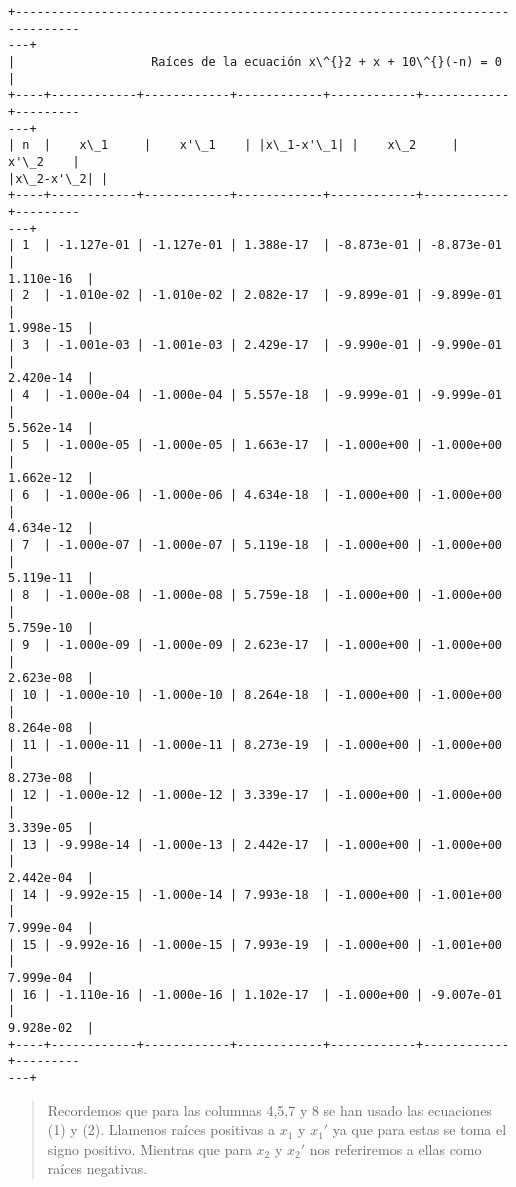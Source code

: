 \documentclass[9pt]{article}
\begin{document}
    \begin{Verbatim}[commandchars=\\\{\}]
+-------------------------------------------------------------------------------
---+
|                   Raíces de la ecuación x\^{}2 + x + 10\^{}(-n) = 0
|
+----+------------+------------+------------+------------+------------+---------
---+
| n  |    x\_1     |    x'\_1    | |x\_1-x'\_1| |    x\_2     |    x'\_2    |
|x\_2-x'\_2| |
+----+------------+------------+------------+------------+------------+---------
---+
| 1  | -1.127e-01 | -1.127e-01 | 1.388e-17  | -8.873e-01 | -8.873e-01 |
1.110e-16  |
| 2  | -1.010e-02 | -1.010e-02 | 2.082e-17  | -9.899e-01 | -9.899e-01 |
1.998e-15  |
| 3  | -1.001e-03 | -1.001e-03 | 2.429e-17  | -9.990e-01 | -9.990e-01 |
2.420e-14  |
| 4  | -1.000e-04 | -1.000e-04 | 5.557e-18  | -9.999e-01 | -9.999e-01 |
5.562e-14  |
| 5  | -1.000e-05 | -1.000e-05 | 1.663e-17  | -1.000e+00 | -1.000e+00 |
1.662e-12  |
| 6  | -1.000e-06 | -1.000e-06 | 4.634e-18  | -1.000e+00 | -1.000e+00 |
4.634e-12  |
| 7  | -1.000e-07 | -1.000e-07 | 5.119e-18  | -1.000e+00 | -1.000e+00 |
5.119e-11  |
| 8  | -1.000e-08 | -1.000e-08 | 5.759e-18  | -1.000e+00 | -1.000e+00 |
5.759e-10  |
| 9  | -1.000e-09 | -1.000e-09 | 2.623e-17  | -1.000e+00 | -1.000e+00 |
2.623e-08  |
| 10 | -1.000e-10 | -1.000e-10 | 8.264e-18  | -1.000e+00 | -1.000e+00 |
8.264e-08  |
| 11 | -1.000e-11 | -1.000e-11 | 8.273e-19  | -1.000e+00 | -1.000e+00 |
8.273e-08  |
| 12 | -1.000e-12 | -1.000e-12 | 3.339e-17  | -1.000e+00 | -1.000e+00 |
3.339e-05  |
| 13 | -9.998e-14 | -1.000e-13 | 2.442e-17  | -1.000e+00 | -1.000e+00 |
2.442e-04  |
| 14 | -9.992e-15 | -1.000e-14 | 7.993e-18  | -1.000e+00 | -1.001e+00 |
7.999e-04  |
| 15 | -9.992e-16 | -1.000e-15 | 7.993e-19  | -1.000e+00 | -1.001e+00 |
7.999e-04  |
| 16 | -1.110e-16 | -1.000e-16 | 1.102e-17  | -1.000e+00 | -9.007e-01 |
9.928e-02  |
+----+------------+------------+------------+------------+------------+---------
---+
    \end{Verbatim}

    \begin{quote}
Recordemos que para las columnas 4,5,7 y 8 se han usado las ecuaciones
(1) y (2). Llamenos raíces positivas a \(x_1\) y \(x_1'\) ya que para
estas se toma el signo positivo. Mientras que para \(x_2\) y \(x_2'\)
nos referiremos a ellas como raíces negativas.
\end{quote}
\end{document}
